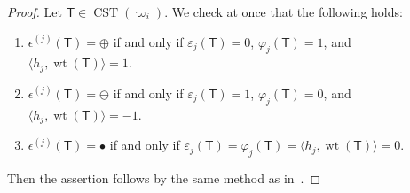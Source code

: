 \documentclass[10pt]{amsart}
\theoremstyle{definition}\newtheorem{defi}[theo]{Definition}
\theoremstyle{remark}\newtheorem{rema}[theo]{Remark}
\newcommand\bm[1]{\boldsymbol{#1}}
\DeclareMathOperator{\wt}{wt}
\DeclareMathOperator{\CST}{CST}
\begin{document}
\begin{proof}
Let $\mathsf{T} \in \CST (\varpi_i)$. 
We check at once that the following holds:
\begin{enumerate}[label=(\arabic*)]
\item
$\epsilon^{(j)}(\mathsf{T}) = \bm{\oplus}$ 
if and only if 
$\varepsilon_j(\mathsf{T}) = 0$, 
$\varphi_j(\mathsf{T}) = 1$, and 
$\langle h_j , \wt (\mathsf{T}) \rangle = 1$.
\item
$\epsilon^{(j)}(\mathsf{T}) = \bm{\ominus}$ 
if and only if 
$\varepsilon_j(\mathsf{T}) = 1$, 
$\varphi_j(\mathsf{T}) = 0$, and 
$\langle h_j , \wt (\mathsf{T}) \rangle = -1$.
\item
$\epsilon^{(j)}(\mathsf{T}) = \bullet$ 
if and only if 
$\varepsilon_j(\mathsf{T}) = \varphi_j(\mathsf{T}) = \langle h_j , \wt (\mathsf{T}) \rangle = 0$. 
\end{enumerate}
Then the assertion follows by the same method as in~\cite[\S~2.1]{KN}.
\end{proof}
\end{document}
